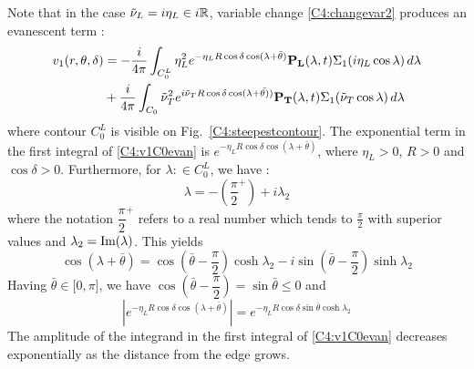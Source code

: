 Note that in the case $\tilde{\nu}_L =i\eta_L \in i\mathbb{R}$, variable change \eqref{C4:changevar2} produces an evanescent term :
\begin{equation}
\begin{split}
v_1(r,\theta,\delta)&=-\frac{i}{4\pi} \int_{C_0^L}\eta_L^2 e^{-\eta_L R\cos\delta\cos(\lambda+\bar{\theta})}\mathbf{ P_L}(\lambda,t)\Sigma_1(i\eta_L\cos\lambda) \, d\lambda\\
&+\frac{i}{4\pi} \int_{C_0}\tilde{\nu}_T^2 e^{i\tilde{\nu}_T R\cos\delta\cos(\lambda+\bar{\theta)})}\mathbf{ P_T}(\lambda,t)\Sigma_1(\tilde{\nu}_T\cos\lambda) \, d\lambda
\end{split}
\label{C4:v1C0evan}
\end{equation}
where contour $C_0^L$ is visible on Fig.~\ref{C4:steepestcontour}. The exponential term in the first integral of \eqref{C4:v1C0evan} is $e^{-\eta_L R\cos\delta\cos(\lambda+\bar{\theta})}$, where $\eta_L>0$, $R>0$ and $\cos\delta>0$. Furthermore, for $\lambda :\in C_0^L$, we have :
\begin{equation}
\lambda=-\left(\dfrac{\pi}{2}^+\right)+i\lambda_2
\end{equation}
where the notation $\dfrac{\pi}{2}^+$ refers to a real number which tends to $\frac{\pi}{2}$ with superior values and $\lambda_2=\rm Im(\lambda)$. This yields
\begin{equation}
\cos(\lambda+\bar{\theta})=\cos(\bar{\theta}-\dfrac{\pi}{2})\cosh\lambda_2-i\sin(\bar{\theta}-\dfrac{\pi}{2})\sinh\lambda_2
\end{equation}
Having $\bar{\theta} \in \lbrack 0,\pi \rbrack$, we have $\cos(\bar{\theta}-\dfrac{\pi}{2})=\sin\bar{\theta}\leq 0$ and 
\begin{equation}
|e^{-\eta_L R\cos\delta\cos(\lambda+\bar{\theta})}|=e^{-\eta_L R\cos\delta\sin\bar{\theta}\cosh\lambda_2}
\end{equation}
The amplitude of the integrand in the first integral of \eqref{C4:v1C0evan} decreases exponentially as the distance from the edge grows. %

